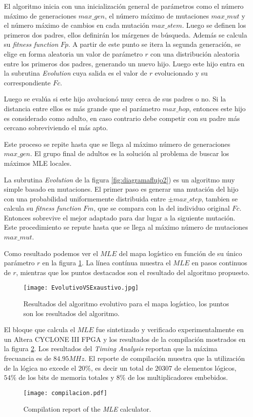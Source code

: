 El algoritmo inicia con una inicialización general de parámetros como el número máximo de generaciones $max\_gen$, el número máximo de mutaciones $max\_mut$ y el número máximo de cambios en cada mutación $max\_stem$.
Luego se definen los primeros dos padres, ellos definirán los márgenes de búsqueda.
Además se calcula su \textit{fitness function} $Fp$.
A partir de este punto se itera la segunda generación, se elige en forma aleatoria un valor de parámetro $r$ con una distribución aleatoria entre los primeros dos padres, generando un nuevo hijo.
Luego este hijo entra en la subrutina \textit{Evolution} cuya salida es el valor de $r$ evolucionado y su correspondiente $Fc$.

Luego se evalúa si este hijo avolucionó muy cerca de sus padres o no.
Si la distancia entre ellos es más grande que el parámetro $max\_hop$, entonces este hijo es considerado como adulto, en caso contrario debe competir con su padre más cercano sobreviviendo el más apto.

Este proceso se repite hasta que se llega al máximo número de  generaciones $max\_gen$.
El grupo final de adultos es la solución al problema de buscar los máximos MLE locales.

La subrutina \textit{Evolution} de la figura \ref{fig:diagramaflujo2}) es un algoritmo muy simple basado en mutaciones.
El primer paso es generar una mutación del hijo con una probabilidad uniformemente distribuida entre $\pm max\_step$, tambien se calcula su \textit{fitness function} $Fm$, que se compara con la del individuo original $Fc$.
Entonces sobrevive el mejor adaptado para dar lugar a la siguiente mutación.
Este procedimiento se repute hasta que se llega al máximo número de mutaciones $max\_mut$.

Como resultado podemos ver el $MLE$ del mapa logístico en función de su único parámetro $r$ en la figura \ref{fig:resultadoAlgorithm}.
La línea contínua muestra el $MLE$ en pasos continuos de $r$, mientras que los puntos destacados son el resultado del algoritmo propuesto.
%
\begin{figure}
	\centering
	\texttt{[image: EvolutivoVSExaustivo.jpg]}\\
	\caption{Resultados del algoritmo evolutivo para el mapa logístico, los puntos son los resultados del algoritmo.}\label{fig:resultadoAlgorithm}
\end{figure}

El bloque que calcula el $MLE$ fue sintetizado y verificado experimentalmente en un Altera CYCLONE III FPGA y los resultados de la compilación mostrados en la figura \ref{fig:compilacion}.
Los resultados del \textit{Timing Analysis} reportan que la máxima frecuancia es de $84.95MHz$.
El reporte de compilación muestra que la utilización de la lógica no excede el $20\%$, es decir un total de $20307$ de elementos lógicos, $54\%$ de los bits de memoria totales y $8\%$ de los multiplicadores embebidos.
%
\begin{figure}
	\centering
	\texttt{[image: compilacion.pdf]}\\
	\caption{Compilation report of the \textit{MLE} calculator.}\label{fig:compilacion}
\end{figure}

